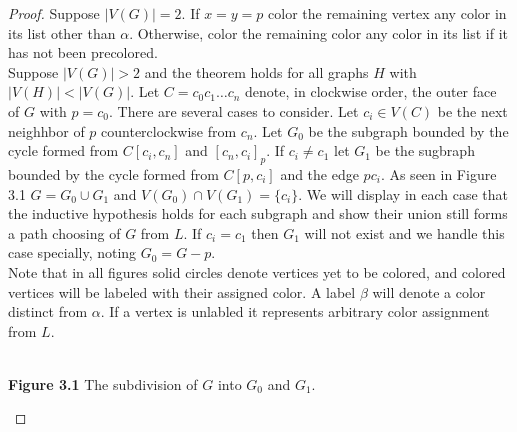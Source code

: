 \documentclass[11pt,letter]{article}
\begin{document}
\begin{proof}
Suppose $|V(G)|=2$. If $x=y=p$ color the remaining vertex any color in its list other than $\alpha$. Otherwise,
color the remaining color any color in its list if it has not been precolored.\\

\noindent Suppose $|V(G)|>2$ and the theorem holds for all graphs $H$ with $|V(H)|<|V(G)|$. Let
$C=c_0c_1\ldots c_n$ denote, in clockwise order, the outer face of $G$ with $p=c_0$.
There are several cases to consider. Let $c_i\in V(C)$ be the next neighhbor of $p$ counterclockwise from $c_n$.
Let $G_0$ be the subgraph bounded by the cycle formed from $C[c_i,c_n]$ and $[c_n,c_i]_p$. If $c_i\ne c_1$ let
$G_1$ be the sugbraph bounded by the cycle formed from $C[p,c_i]$ and the edge $pc_i$. As seen in Figure
3.1 $G=G_0\cup G_1$
and $V(G_0)\cap V(G_1)=\{c_i\}$.
We will display in each case that the inductive hypothesis holds for each subgraph and show their union still
forms a path choosing of $G$ from $L$.
If $c_i=c_1$ then $G_1$ will not exist and we handle this case specially, noting $G_0=G-p$.\\

\noindent Note that in all figures solid circles denote vertices yet to be colored, and colored vertices will
be labeled with their assigned color. A label $\beta$ will denote a color distinct from $\alpha$. If a vertex
is unlabled it represents arbitrary color assignment from $L$.

\begin{center}
\hfill\\
\textbf{Figure 3.1} The subdivision of $G$ into $G_0$ and $G_1$.
\end{center}


\end{proof}
\end{document}
